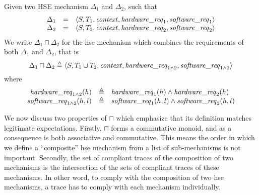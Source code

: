 \begin{definition}
  Given two HSE mechanism \( \Delta_1 \) and \( \Delta_2 \), such that
%
  \[
    \begin{array}{rcl}
      \Delta_1
      & =
      & \langle S, T_1, \mathit{context}, \mathit{hardware\_req}_1, \mathit{software\_req}_1
        \rangle \\
      \Delta_2
      & =
      & \langle S, T_2, \mathit{context}, \mathit{hardware\_req}_2, \mathit{software\_req}_2
        \rangle
    \end{array}
  \]
%
  We write $\Delta_1 \sqcap \Delta_2$ for the \ac{hse} mechanism which combines
  the requirements of both $\Delta_1$ and $\Delta_2$, that is
%
  \[
    \Delta_1 \sqcap \Delta_2 \triangleq \langle S, T_1 \cup T_2, \mathit{context},
    \mathit{hardware\_req}_{1\wedge2}, \mathit{software\_req}_{1\wedge2} \rangle
  \]
%
  where
  \[
    \begin{array}{rcl}
      \mathit{hardware\_req}_{1\wedge2}(h)
      & \triangleq
      & \mathit{hardware\_req}_1(h) \wedge \mathit{hardware\_req}_2(h) \\
      \mathit{software\_req}_{1\wedge2}(h,l)
      & \triangleq
      & \mathit{software\_req}_1(h,l) \wedge \mathit{software\_req}_2(h,l)
    \end{array}
  \]
\end{definition}

We now discuss two properties of \( \sqcap \) which emphasize that its
definition matches legitimate expectations.
%
Firstly, \( \sqcap \) forms a commutative monoid, and as a consequence is both
associative and commutative.
%
This means the order in which we define a ``composite'' \ac{hse} mechanism from
a list of sub-mechanisms is not important.
%
Secondly, the set of compliant traces of the composition of two mechanisms is
the intersection of the sets of compliant traces of these mechanisms.
%
In other word, to comply with the composition of two \ac{hse} mechanisms, a
trace has to comply with each mechanism individually.

